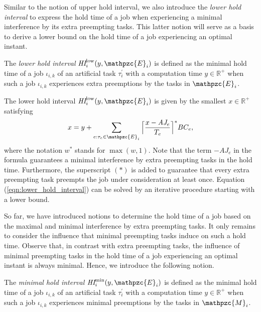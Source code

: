 Similar to the notion of upper hold interval, we also introduce the \textit{lower hold interval} to express the hold time of a job when experiencing a minimal interference by its extra preempting tasks. This latter notion will serve as a basis to derive a lower bound on the hold time of a job experiencing an optimal instant.

\begin{definition}
	The \textit{lower hold interval} $\hi^{\rm{low}}_i(y,\mathpzc{E}_i)$ is defined as the minimal hold time of a job $\iota_{i,k}$ of an artificial task $\tau^{\prime}_i$ with a computation time $y \in \mathbb{R}^+$ when such a job $\iota_{i,k}$ experiences extra preemptions by the tasks in $\mathpzc{E}_i$.
\end{definition}
The {lower hold interval} $\hi^{\rm{low}}_i(y,\mathpzc{E}_i)$ is given by the smallest $x \in \mathbb{R}^+$ satisfying
\begin{align} \label{eqn:lower_hold_interval}
x = y + \sum\limits_{e:\tau_e \in \mathpzc{E}_i}\Big\lceil  \dfrac{x- \aj_e}{T_e}\Big\rceil^{*}  BC_e,
\end{align}
where the notation $w^*$ stands for $\max(w,1)$. Note that the term $-AJ_e$ in the formula guarantees a minimal interference by extra preempting tasks in the hold time. Furthermore, the superscript $(*)$ is added to guarantee that every extra preempting task preempts the job under consideration at least once. Equation (\ref{eqn:lower_hold_interval}) can be solved by an iterative procedure starting with a lower bound.

So far, we have introduced notions to determine the hold time of a job based on the maximal and minimal interference by extra preempting tasks. It only remains to consider the influence that minimal preempting tasks induce on such a hold time. Observe that, in contrast with extra preempting tasks, the influence of minimal preempting tasks in the hold time of a job experiencing an optimal instant is always minimal. Hence, we introduce the following notion.

\begin{definition} \label{def:best_case_interval}
	The \textit{minimal hold interval} $\hi^{\rm{min}}_i(y,\mathpzc{E}_i)$ is defined as the minimal hold time of a job $\iota_{i,k}$ of an artificial task $\tau^{\prime}_i$ with a computation time $y \in \mathbb{R}^+$ when such a job $\iota_{i,k}$ experiences minimal preemptions by the tasks in $\mathpzc{M}_i$.
\end{definition}


